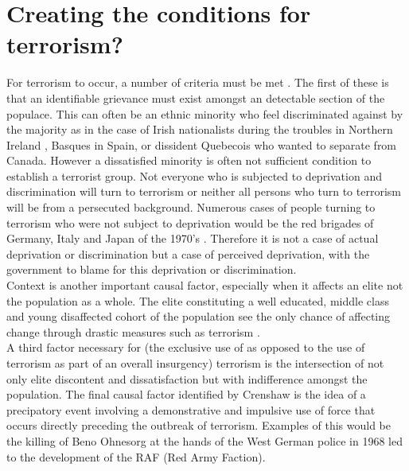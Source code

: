 \section{Creating the conditions for terrorism?}
For terrorism to occur, a number of criteria must be met \citep{crenshaw1981causes}. The first of these is that an identifiable grievance must exist amongst an detectable section of the populace. This can often be an ethnic minority who feel discriminated against by the majority as in the case  of Irish nationalists during the troubles in Northern Ireland , Basques in Spain, or dissident Quebecois who wanted to separate from Canada. However a dissatisfied minority is often not sufficient condition to establish a terrorist group. Not everyone who is subjected to deprivation and discrimination will turn to terrorism or neither all persons who turn to terrorism will be from a persecuted background. Numerous cases of people turning to terrorism who were not subject to deprivation would be the red brigades of Germany, Italy and Japan of the 1970's \citep{zwerman2000disappearing}. Therefore it is not a case of actual deprivation or discrimination but a case of perceived deprivation, with the government to blame for this deprivation or discrimination.
\\
Context is another important causal factor, especially when it affects an elite not the population as a whole.  The elite constituting a well educated, middle class and young disaffected cohort of the population see the only chance of affecting change through drastic measures such as terrorism \citep{ronchey1979guns}.
\\
A third factor necessary for (the exclusive use of as opposed to the use of terrorism as part of an overall insurgency) terrorism is the intersection of not only elite discontent and dissatisfaction but with indifference amongst the population. The final causal factor identified by Crenshaw \citep{crenshaw1981causes} is the idea of a precipatory event involving a demonstrative and impulsive use of force that occurs directly preceding the outbreak of terrorism. Examples of this would be the killing of Beno Ohnesorg at the hands of the West German police in 1968 led to the development of the RAF (Red Army Faction).

